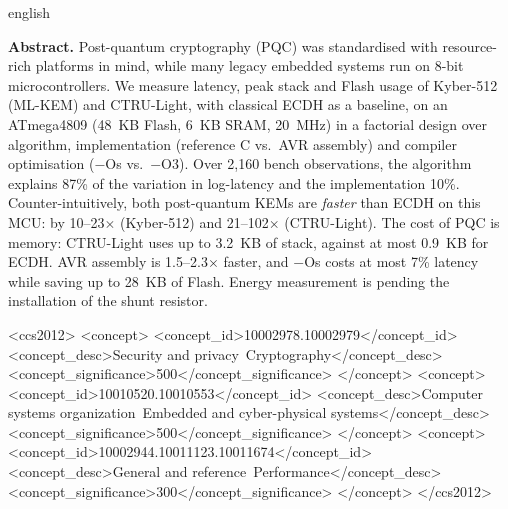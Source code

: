 \documentclass[acmsmall,nonacm,language=english,language=brazilian]{acmart}
\begin{document}
\begin{translatedabstract}{english}
\noindent\rule{0pt}{2\baselineskip}\textbf{Abstract.}\space
Post-quantum cryptography (PQC) was standardised with resource-rich platforms
in mind, while many legacy embedded systems run on 8-bit microcontrollers.
We measure latency, peak stack and Flash usage of Kyber-512 (ML-KEM) and
CTRU-Light, with classical ECDH as a baseline, on an ATmega4809 (48~KB Flash,
6~KB SRAM, 20~MHz) in a factorial design over algorithm, implementation
(reference C vs.\ AVR assembly) and compiler optimisation ($-$Os vs.\ $-$O3).
Over 2,160 bench observations, the algorithm explains 87\% of the variation in
log-latency and the implementation 10\%. Counter-intuitively, both
post-quantum KEMs are \emph{faster} than ECDH on this MCU: by 10--23$\times$
(Kyber-512) and 21--102$\times$ (CTRU-Light). The cost of PQC is memory:
CTRU-Light uses up to 3.2~KB of stack, against at most 0.9~KB for ECDH. AVR
assembly is 1.5--2.3$\times$ faster, and $-$Os costs at most 7\% latency
while saving up to 28~KB of Flash. Energy measurement is pending the
installation of the shunt resistor.
\end{translatedabstract}

\begin{CCSXML}
<ccs2012>
 <concept>
  <concept_id>10002978.10002979</concept_id>
  <concept_desc>Security and privacy~Cryptography</concept_desc>
  <concept_significance>500</concept_significance>
 </concept>
 <concept>
  <concept_id>10010520.10010553</concept_id>
  <concept_desc>Computer systems organization~Embedded and cyber-physical systems</concept_desc>
  <concept_significance>500</concept_significance>
 </concept>
 <concept>
  <concept_id>10002944.10011123.10011674</concept_id>
  <concept_desc>General and reference~Performance</concept_desc>
  <concept_significance>300</concept_significance>
 </concept>
</ccs2012>
\end{CCSXML}


\end{document}
